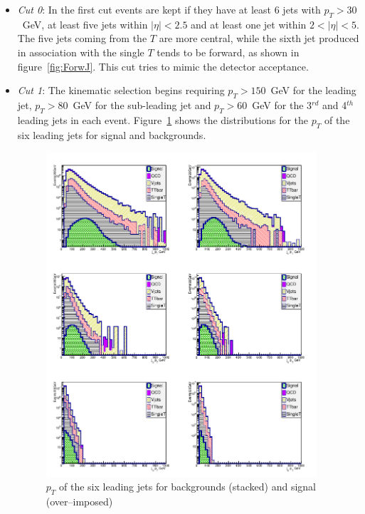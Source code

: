 \begin{itemize}

\item \textit{Cut 0}: In the first cut events are kept if they have at least 6 jets with $p_T > 30$~GeV, at least five jets within $|\eta|<2.5$ and at least one jet within $2<|\eta|<5$. The five jets coming from the $T$ are more central, while the sixth jet produced in association with the single $T$ tends to be forward, as shown in figure~\ref{fig:ForwJ}. This cut tries to mimic the detector acceptance.

\item \textit{Cut 1}: The kinematic selection begins requiring $p_{T}>150$~GeV for the leading jet, $p_{T}>80$~GeV for the sub-leading jet and $p_{T}>60$~GeV for the 3$^{rd}$ and 4$^{th}$ leading jets in each event. Figure~\ref{fig:Var1} shows the distributions for the $p_{T}$ of the six leading jets for signal and backgrounds.

\begin{figure}[!Hhtbp]
  \begin{center}
    \includegraphics[width=0.95\textwidth]{figs/Pheno/JetPt.png}
    \caption{$p_{T}$  of the six leading jets for backgrounds (stacked) and signal (over--imposed)}
    \label{fig:Var1}
  \end{center}
\end{figure}


\end{itemize}

